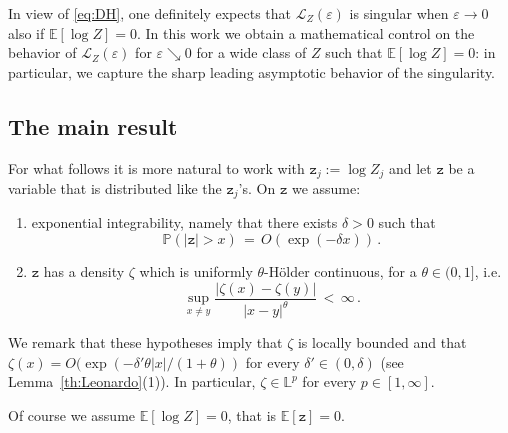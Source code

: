 \documentclass[reqno,11pt]{amsart}
\numberwithin{equation}{section}
\newcommand{\cL}{{\ensuremath{\mathcal L}} }
\newcommand{\dd}{\,\text{\rm d}}             %
\newcommand{\bbE}{{\ensuremath{\mathbb E}} }
\newcommand{\bbL}{{\ensuremath{\mathbb L}} }
\newcommand{\bbN}{{\ensuremath{\mathbb N}} }
\newcommand{\bbP}{{\ensuremath{\mathbb P}} }
\newcommand{\bbR}{{\ensuremath{\mathbb R}} }
\newcommand{\gd}{\delta}
\newcommand{\gep}{\varepsilon}       %
\newcommand{\gp}{\varphi}
\newcommand{\gz}{\zeta}
\newcommand{\logZ}{\mathtt{z}}
\begin{document}
In view of \eqref{eq:DH}, one definitely expects  that $\cL_Z(\gep)$ is singular when  $\gep \to 0$ also if $\bbE[\log Z] =0$. 
In  this work we obtain a mathematical control on the  behavior of  $\cL_Z(\gep)$ for $\gep \searrow 0$ for a wide class of $Z$ such that $\bbE[\log Z]=0$: in particular, we capture the sharp leading asymptotic behavior of the singularity. 

\subsection{The main result}
\label{sec:maires}




For what follows it is  more natural to work with $\logZ_j:= \log Z_j$ and let $\logZ$ be a variable that is distributed like the $\logZ_j$'s.   On $\logZ$ we assume: 
\smallskip

\begin{enumerate}[leftmargin=*]
\item  exponential integrability, namely that there exists  $\gd>0$  such that %
\begin{equation}
\label{eq:LR}
\bbP\left( \left \vert  \logZ\right \vert > x\right) \,=\, O \left( \exp\left( -\gd x\right)\right) \, .
\end{equation} 
\item $\logZ$ has a density  $\gz$ which  is uniformly $\theta$-H\"older continuous, for a $\theta \in (0, 1]$, i.e.\ 
\begin{equation} 
\label{eq:Holder}
\sup _{x\not= y}
\frac{\vert \gz(x)-\gz(y)\vert}{\vert x - y \vert ^\theta} \,<\,  \infty \, .
\end{equation}  
\end{enumerate}
\smallskip 


We remark that these hypotheses imply  that $\gz$ is locally bounded and that $\gz(x)=O(\exp(-\gd' \theta\vert x \vert/(1+ \theta))$ for every $\gd'\in (0, \gd)$ (see Lemma~\ref{th:Leonardo}(1)). In particular,  $\gz \in \bbL^p$ for every $p\in [1, \infty]$.  

\smallskip

Of course we assume $\bbE[\log Z]=0$, that is  $\bbE[\logZ]=0$. 
\end{document}
